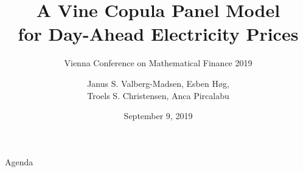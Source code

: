 \documentclass[10pt]{beamer}
\title{A Vine Copula Panel Model\\for Day-Ahead Electricity Prices}
\subtitle{Vienna Conference on Mathematical Finance 2019}
\author{
  Janus S. Valberg-Madsen,
  Esben Høg,\\
  Troels S. Christensen,
  Anca Pircalabu
}
\date{September 9, 2019}
\begin{document}
{\aauwavesbg
  \begin{frame}
    \titlepage
  \end{frame}
}

\begin{frame}{Agenda}{}
  \tableofcontents
\end{frame}








\end{document}

